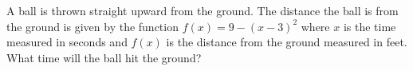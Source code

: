 \documentclass{ximera}
\author{Kenneth Berglund}
\begin{document}
\begin{exercise}
A ball is thrown straight upward from the ground.  The distance the ball is from the ground is given by the function $f(x)=9-(x-3)^2$ where $x$ is the time measured in seconds and $f(x)$ is the distance from the ground measured in feet.  What time will the ball hit the ground?
\begin{multipleChoice}
\end{multipleChoice}

\end{exercise}
\end{document}
